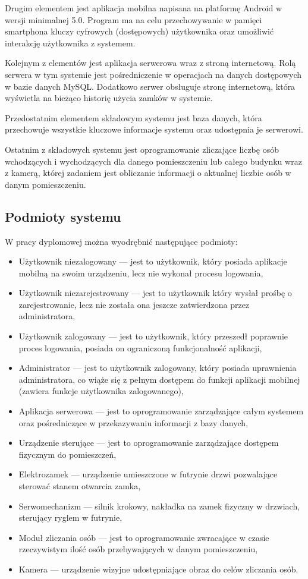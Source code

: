 Drugim elementem jest aplikacja mobilna napisana na platformę Android w wersji minimalnej 5.0. Program ma na celu przechowywanie w pamięci smartphona kluczy cyfrowych (dostępowych) użytkownika oraz umożliwić interakcję użytkownika z systemem.

Kolejnym z elementów jest aplikacja serwerowa wraz z stroną internetową. Rolą serwera w tym systemie jest pośredniczenie w operacjach na danych dostępowych w bazie danych MySQL. Dodatkowo serwer obsługuje stronę internetową, która wyświetla na bieżąco historię użycia zamków w systemie.

Przedostatnim elementem składowym systemu jest baza danych, która przechowuje wszystkie kluczowe informacje systemu oraz udostępnia je serwerowi.

Ostatnim z składowych systemu jest oprogramowanie zliczające liczbę osób wchodzących i wychodzących dla danego pomieszczeniu lub całego budynku wraz z kamerą, której zadaniem jest obliczanie informacji o aktualnej liczbie osób w danym pomieszczeniu. 

\newpage
\subsection{Podmioty systemu} 
W pracy dyplomowej można wyodrębnić następujące podmioty:
	\begin{itemize}
	\item {Użytkownik niezalogowany} --- jest to użytkownik, który posiada aplikacje mobilną na swoim urządzeniu, lecz nie wykonał procesu logowania,
	\item {Użytkownik niezarejestrowany} --- jest to użytkownik który wysłał prośbę o zarejestrowanie, lecz nie została ona jeszcze zatwierdzona przez administratora,
	\item {Użytkownik zalogowany} --- jest to użytkownik, który przeszedł poprawnie proces logowania, posiada on ograniczoną funkcjonalność aplikacji,
	\item {Administrator} --- jest to użytkownik zalogowany, który posiada uprawnienia administratora, co wiąże się z pełnym dostępem do funkcji aplikacji mobilnej (zawiera funkcje użytkownika zalogowanego),
	\item {Aplikacja serwerowa} --- jest to oprogramowanie zarządzające całym systemem oraz pośredniczące w przekazywaniu informacji z bazy danych,
	\item {Urządzenie sterujące} --- jest to oprogramowanie zarządzające dostępem fizycznym do pomieszczeń,
	\item {Elektrozamek} --- urządzenie umieszczone w futrynie drzwi pozwalające sterować stanem otwarcia zamka,
	\item {Serwomechanizm} --- silnik krokowy, nakładka na zamek fizyczny w drzwiach, sterujący ryglem w futrynie,
	\item {Moduł zliczania osób} --- jest to oprogramowanie zwracające w czasie rzeczywistym ilość osób przebywających w danym pomieszczeniu,
	\item {Kamera} --- urządzenie wizyjne udostępniające obraz do celów zliczania osób.
\end{itemize}